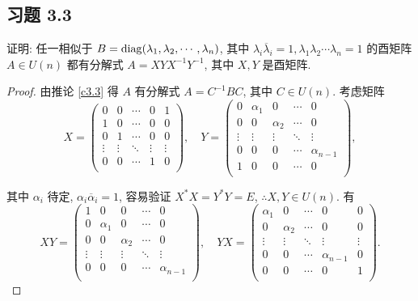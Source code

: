 \documentclass[color=black,device=normal,lang=cn,mode=geye]{elegantnote}
\begin{document}
\subsection{习题 3.3}
\begin{exercise}%
    证明: 任一相似于 $B=\operatorname{diag} (\lambda_1,\lambda_2,\cdots,\lambda_n)$, 其中 $\lambda_i\overline{\lambda}_i=1,\lambda_1\lambda_2\cdots\lambda_n=1$ 的酉矩阵 $A\in U(n)$ 都有分解式 $A=XYX^{-1}Y^{-1}$, 其中 $X,Y$ 是酉矩阵.
\end{exercise}
\begin{proof}
    由推论 \ref{c3.3} 得 $A$ 有分解式 $A=C^{-1}BC$, 其中 $C\in U(n)$. 考虑矩阵
    \[X=\begin{pmatrix}
        0 & 0 & \cdots & 0 & 1 \\
        1 & 0 & \cdots & 0 & 0 \\
        0 & 1 & \cdots & 0 & 0 \\
        \vdots & \vdots & \ddots & \vdots & \vdots \\
        0 & 0 & \cdots & 1 & 0 \\
    \end{pmatrix},\quad Y=\begin{pmatrix}
        0 & \alpha_1 & 0 & \cdots & 0 \\
        0 & 0 & \alpha_2 & \cdots & 0 \\
        \vdots & \vdots & \vdots & \ddots & \vdots \\
        0 & 0 & 0 & \cdots & \alpha_{n-1} \\
        1 & 0 & 0 & \cdots & 0 \\
    \end{pmatrix},\]

    其中 $\alpha_i$ 待定, $\alpha_i\overline{\alpha}_i=1$, 容易验证 $X^*X=Y^*Y=E$, $\therefore X,Y\in U(n)$. 有
    \[XY=\begin{pmatrix}
        1 & 0 & 0 & \cdots & 0 \\
        0 & \alpha_1 & 0 & \cdots & 0 \\
        0 & 0 & \alpha_2 & \cdots & 0 \\
        \vdots & \vdots & \vdots & \ddots & \vdots \\
        0 & 0 & 0 & \cdots & \alpha_{n-1} \\
    \end{pmatrix},\quad YX=\begin{pmatrix}
        \alpha_1 & 0 & \cdots & 0 & 0 \\
        0 & \alpha_2 & \cdots & 0 & 0 \\
        \vdots & \vdots & \ddots & \vdots & \vdots \\
        0 & 0 & \cdots & \alpha_{n-1} & 0 \\
        0 & 0 & \cdots & 0 & 1 \\
    \end{pmatrix}.\]


\end{proof}
\end{document}
